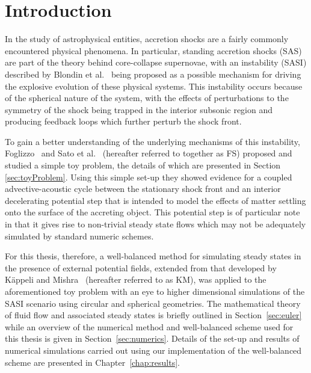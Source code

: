 \newcommand{\package}{\emph}

\chapter{Introduction}
\label{chap:introduction}

In the study of astrophysical entities, accretion shocks are a fairly commonly encountered physical phenomena. In particular, standing accretion shocks (SAS) are part of the theory behind core-collapse supernovae, with an instability (SASI) described by Blondin et al.~\cite{Blondin2003} being proposed as a possible mechanism for driving the explosive evolution of these physical systems. This instability occurs because of the spherical nature of the system, with the effects of perturbations to the symmetry of the shock being trapped in the interior subsonic region and producing feedback loops which further perturb the shock front.

To gain a better understanding of the underlying mechanisms of this instability, Foglizzo~\cite{Foglizzo2009} and Sato et al.~\cite{Sato2009} (hereafter referred to together as FS) proposed and studied a simple toy problem, the details of which are presented in Section \ref{sec:toyProblem}. Using this simple set-up they showed evidence for a coupled advective-acoustic cycle between the stationary shock front and an interior decelerating potential step that is intended to model the effects of matter settling onto the surface of the accreting object. This potential step is of particular note in that it gives rise to non-trivial steady state flows which may not be adequately simulated by standard numeric schemes.

For this thesis, therefore, a well-balanced method for simulating steady states in the presence of external potential fields, extended from that developed by K\"appeli and Mishra~\cite{Kappeli2014} (hereafter referred to as KM), was applied to the aforementioned toy problem with an eye to higher dimensional simulations of the SASI scenario using circular and spherical geometries. The mathematical theory of fluid flow and associated steady states is briefly outlined in Section~\ref{sec:euler} while an overview of the numerical method and well-balanced scheme used for this thesis is given in Section~\ref{sec:numerics}. Details of the set-up and results of numerical simulations carried out using our implementation of the well-balanced scheme are presented in Chapter~\ref{chap:results}.


